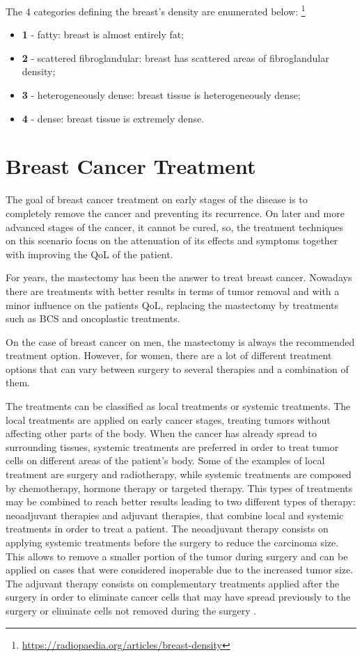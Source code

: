 The 4 categories defining the breast's density are enumerated below: \footnote{\url{https://radiopaedia.org/articles/breast-density}}
\begin{itemize}
\item \textbf{1} - fatty: breast is almost entirely fat;
\item \textbf{2} - scattered fibroglandular: breast has scattered areas of fibroglandular density;
\item \textbf{3} - heterogeneously dense: breast tissue is heterogeneously dense;
\item \textbf{4} - dense: breast tissue is extremely dense.
\end{itemize}

\section{Breast Cancer Treatment}\label{sec:treatment}

The goal of breast cancer treatment on early stages of the disease is to completely remove the cancer and preventing its recurrence. On later and more advanced stages of the cancer, it cannot be cured, so, the treatment techniques on this scenario focus on the attenuation of its effects and symptoms together with improving the QoL of the patient.

For years, the mastectomy has been the answer to treat breast cancer. Nowadays there are treatments with better results in terms of tumor removal and with a minor influence on the patients QoL, replacing the mastectomy by treatments such as BCS and oncoplastic treatments.

On the case of breast cancer on men, the mastectomy is always the recommended treatment option. However, for women, there are a lot of different treatment options that can vary between surgery to several therapies and a combination of them.

The treatments can be classified as local treatments or systemic treatments. The local treatments are applied on early cancer stages, treating tumors without affecting other parts of the body. When the cancer has already spread to surrounding tissues, systemic treatments are preferred in order to treat tumor cells on different areas of the patient's body. Some of the examples of local treatment are surgery and radiotherapy, while systemic treatments are composed by chemotherapy, hormone therapy or targeted therapy. This types of treatments may be combined to reach better results leading to two different types of therapy: neoadjuvant therapies and adjuvant therapies, that combine local and systemic treatments in order to treat a patient. The neoadjuvant therapy consists on applying systemic treatments before the surgery to reduce the carcinoma size. This allows to remove a smaller portion of the tumor during surgery and can be applied on cases that were considered inoperable due to the increased tumor size. The adjuvant therapy consists on complementary treatments applied after the surgery in order to eliminate cancer cells that may have spread previously to the surgery or eliminate cells not removed during the surgery \cite{De2016}.

